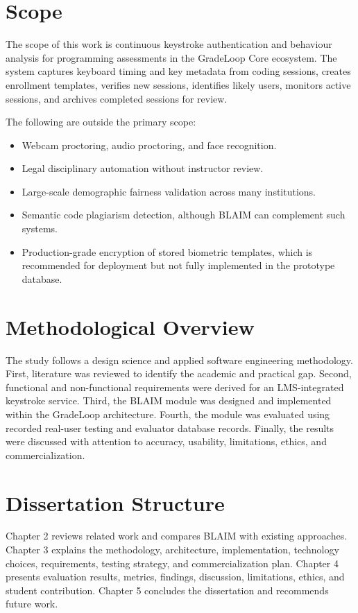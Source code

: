 \section{Scope}
\label{sec:scope}

The scope of this work is continuous keystroke authentication and behaviour analysis for programming assessments in the GradeLoop Core ecosystem. The system captures keyboard timing and key metadata from coding sessions, creates enrollment templates, verifies new sessions, identifies likely users, monitors active sessions, and archives completed sessions for review.

The following are outside the primary scope:

\begin{itemize}
  \item Webcam proctoring, audio proctoring, and face recognition.
  \item Legal disciplinary automation without instructor review.
  \item Large-scale demographic fairness validation across many institutions.
  \item Semantic code plagiarism detection, although BLAIM can complement such systems.
  \item Production-grade encryption of stored biometric templates, which is recommended for deployment but not fully implemented in the prototype database.
\end{itemize}

\section{Methodological Overview}
\label{sec:method-overview}

The study follows a design science and applied software engineering methodology. First, literature was reviewed to identify the academic and practical gap. Second, functional and non-functional requirements were derived for an LMS-integrated keystroke service. Third, the BLAIM module was designed and implemented within the GradeLoop architecture. Fourth, the module was evaluated using recorded real-user testing and evaluator database records. Finally, the results were discussed with attention to accuracy, usability, limitations, ethics, and commercialization.

\section{Dissertation Structure}
\label{sec:structure}

Chapter 2 reviews related work and compares BLAIM with existing approaches. Chapter 3 explains the methodology, architecture, implementation, technology choices, requirements, testing strategy, and commercialization plan. Chapter 4 presents evaluation results, metrics, findings, discussion, limitations, ethics, and student contribution. Chapter 5 concludes the dissertation and recommends future work.

\clearpage
